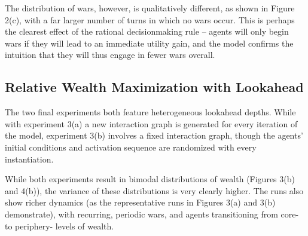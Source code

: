 \documentclass{article}
\begin{document}
The distribution of wars, however, is qualitatively different, as shown in Figure 2(c), with a far larger number of turns in which no wars occur. This is perhaps the clearest effect of the rational decisionmaking rule -- agents will only begin wars if they will lead to an immediate utility gain, and the model confirms the intuition that they will thus engage in fewer wars overall. 

\subsection{Relative Wealth Maximization with Lookahead}

The two final experiments both feature heterogeneous lookahead depths. While with experiment 3(a) a new interaction graph is generated for every iteration of the model, experiment 3(b) involves a fixed interaction graph, though the agents' initial conditions and activation sequence are randomized with every instantiation. 

While both experiments result in bimodal distributions of wealth (Figures 3(b) and 4(b)), the variance of these distributions is very clearly higher. The runs also show richer dynamics (as the representative runs in Figures 3(a) and 3(b) demonstrate), with recurring, periodic wars, and agents transitioning from core- to periphery- levels of wealth. 
\end{document}
